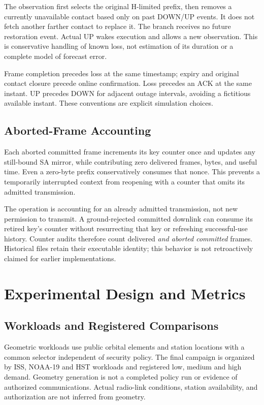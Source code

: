 \documentclass[conference]{IEEEtran}
\begin{document}
The observation first selects the original H-limited prefix, then removes a currently unavailable contact based only on past DOWN/UP events. It does not fetch another farther contact to replace it. The branch receives no future restoration event. Actual UP wakes execution and allows a new observation. This is conservative handling of known loss, not estimation of its duration or a complete model of forecast error.

Frame completion precedes loss at the same timestamp; expiry and original contact closure precede online confirmation. Loss precedes an ACK at the same instant. UP precedes DOWN for adjacent outage intervals, avoiding a fictitious available instant. These conventions are explicit simulation choices.

\subsection{Aborted-Frame Accounting}
Each aborted committed frame increments its key counter once and updates any still-bound SA mirror, while contributing zero delivered frames, bytes, and useful time. Even a zero-byte prefix conservatively consumes that nonce. This prevents a temporarily interrupted context from reopening with a counter that omits its admitted transmission.

The operation is accounting for an already admitted transmission, not new permission to transmit. A ground-rejected committed downlink can consume its retired key's counter without resurrecting that key or refreshing successful-use history. Counter audits therefore count delivered \emph{and aborted committed} frames. Historical files retain their executable identity; this behavior is not retroactively claimed for earlier implementations.

\section{Experimental Design and Metrics}
\subsection{Workloads and Registered Comparisons}
Geometric workloads use public orbital elements and station locations with a common selector independent of security policy. The final campaign is organized by ISS, NOAA-19 and HST workloads and registered low, medium and high demand. Geometry generation is not a completed policy run or evidence of authorized communications. Actual radio-link conditions, station availability, and authorization are not inferred from geometry.
\end{document}
